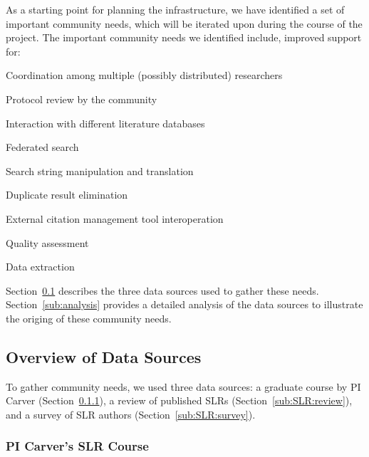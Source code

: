 
As a starting point for planning the infrastructure, we have identified a set of important community needs, which will be iterated upon during the course of the project. The important community needs we identified include, improved support for:
\vspace*{-4pt}
\begin{enumerate*}
	\item{Coordination among multiple (possibly distributed) researchers}
	\item{Protocol review by the community}
	\item{Interaction with different literature databases}
	\begin{enumerate*}
		\item{Federated search}
		\item{Search string manipulation and translation}
		\item{Duplicate result elimination}
		\item{External citation management tool interoperation}
	\end{enumerate*}
	\item{Quality assessment}
	\item{Data extraction}
\end{enumerate*}
\vspace*{-4pt}

Section~\ref{sub:sources} describes the three data sources used to gather these needs. Section~\ref{sub:analysis} provides a detailed analysis of the data sources to illustrate the origing of these community needs.

\subsection{Overview of Data Sources}
\label{sub:sources}

To gather community needs, we used three data sources: a graduate course by PI Carver (Section~\ref{sub:SLR:course}), a review of published SLRs (Section~\ref{sub:SLR:review}), and a survey of SLR authors (Section~\ref{sub:SLR:survey}).

\subsubsection{PI Carver's SLR Course}
\label{sub:SLR:course}

